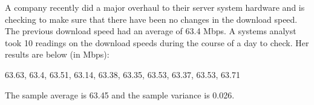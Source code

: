 \documentclass[addpoints]{examsetup}\usepackage[]{graphicx}\usepackage[]{color}
\begin{document}
\begin{questions}

\newpage

\question
   
   A company recently did a major overhaul to their server system hardware and is checking to make sure that there have been no changes in the download speed.
   The previous download speed had an average of 63.4 Mbps.
   A systems analyst took 10 readings on the download speeds during the course of a day to check. 
   Her results are below (in Mbps):



\begin{center}
   63.63, 63.4, 63.51, 63.14, 63.38, 63.35, 63.53, 63.37, 63.53, 63.71
\end{center}

The sample average is 63.45 and the sample variance is 0.026.

\end{questions}
\end{document}
